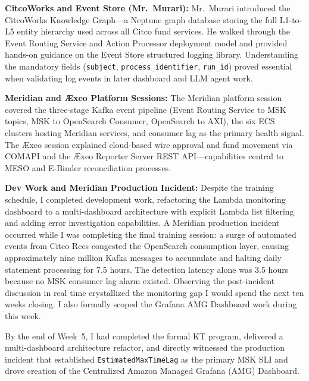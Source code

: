 \textbf{CitcoWorks and Event Store (Mr.\ Murari):} 
Mr.\ Murari introduced
the CitcoWorks Knowledge Graph---a Neptune graph database storing the full
L1-to-L5 entity hierarchy used across all Citco fund services. He walked
through the Event Routing Service and Action Processor deployment model
and provided hands-on guidance on the Event Store structured logging library.
Understanding the mandatory fields (\texttt{subject}, \texttt{process\_identifier},
\texttt{run\_id}) proved essential when validating log events in later
dashboard and LLM agent work.

\textbf{Meridian and \AE xeo Platform Sessions:} 
The Meridian platform session
covered the three-stage Kafka event pipeline (Event Routing Service to MSK
topics, MSK to OpenSearch Consumer, OpenSearch to AXI), the six ECS clusters
hosting Meridian services, and consumer lag as the primary health signal.
The \AE xeo session explained cloud-based wire approval and fund movement
via COMAPI and the \AE xeo Reporter Server REST API---capabilities central
to MESO and E-Binder reconciliation processes.

\textbf{Dev Work and Meridian Production Incident:} 
Despite the training schedule, I completed development work, refactoring the Lambda monitoring dashboard to a multi-dashboard architecture
with explicit Lambda list filtering and adding error investigation capabilities.
A Meridian production incident occurred while I was
completing the final training session: a surge of automated events from
Citco Recs congested the OpenSearch consumption layer, causing approximately
nine million Kafka messages to accumulate and halting daily statement processing
for 7.5 hours. The detection latency alone was 3.5 hours because no MSK
consumer lag alarm existed. Observing the post-incident discussion in real
time crystallized the monitoring gap I would spend the next ten weeks closing.
I also formally scoped the Grafana AMG Dashboard work during this week.

By the end of Week~5, I had completed the formal KT program, delivered
a multi-dashboard architecture refactor, and directly witnessed the production
incident that established \texttt{EstimatedMaxTimeLag} as the primary MSK
SLI and drove creation of the Centralized Amazon Managed Grafana (AMG) Dashboard.


\FloatBarrier

